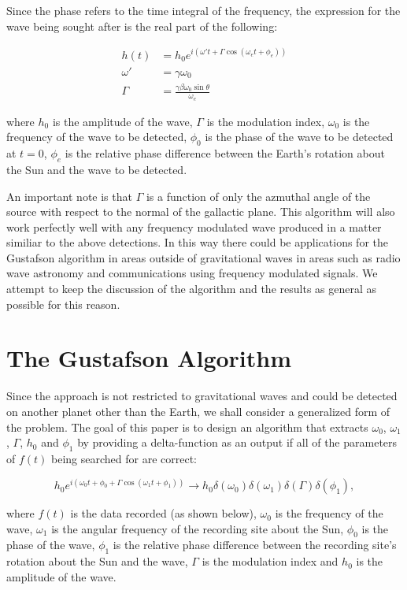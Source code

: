 \documentclass[onecolumn, groupedaddress, 10pt]{revtex4-1}
\begin{document}
Since the phase refers to the time integral of the frequency, the expression for the wave being sought after is the real part of the following: 

\begin{align}
h(t)    &= h_0 e^{i \left( \omega' t + \Gamma \cos (\omega_e t + \phi_e) \right)}		\\
\omega' &= \gamma \omega_0															\\
\Gamma  &= \frac{\gamma \beta \omega_0 \sin \theta}{\omega_e}
\end{align}


where $h_0$ is the amplitude of the wave, $\Gamma$ is the modulation index, $\omega_0$ is the frequency of the wave to be detected, $\phi_0$ is the phase of the wave to be detected at $t=0$, $\phi_e$ is the relative phase difference between the Earth's rotation about the Sun and the wave to be detected.

An important note is that $\Gamma$ is a function of only the azmuthal angle of the source with respect to the normal of the gallactic plane. This algorithm will also work perfectly well with any frequency modulated wave produced in a matter similiar to the above detections. In this way there could be applications for the Gustafson algorithm in areas outside of gravitational waves in areas such as radio wave astronomy and communications using frequency modulated signals. We attempt to keep the discussion of the algorithm and the results as general as possible for this reason.

\section{The Gustafson Algorithm}
Since the approach is not restricted to gravitational waves and could be detected on another planet other than the Earth, we shall consider a generalized form of the problem. The goal of this paper is to design an algorithm that extracts $\omega_0$, $\omega_1$, $\Gamma$, $h_0$ and $\phi_1$ by providing a delta-function as an output if all of the parameters of $f(t)$ being searched for are correct:

\begin{equation}
h_0 e^{i\left( \omega_0 t + \phi_0 + \Gamma \cos (\omega_1 t + \phi_1 ) \right)} \to h_0 \delta (\omega_0) \delta (\omega_1 ) \delta (\Gamma ) \delta(\phi_1),
\end{equation}

where $f(t)$ is the data recorded (as shown below), $\omega_0$ is the frequency of the wave, $\omega_1$ is the angular frequency of the recording site about the Sun, $\phi_0$ is the phase of the wave, $\phi_1$ is the relative phase difference between the recording site's rotation about the Sun and the wave, $\Gamma$ is the modulation index and $h_0$ is the amplitude of the wave.
\end{document}
